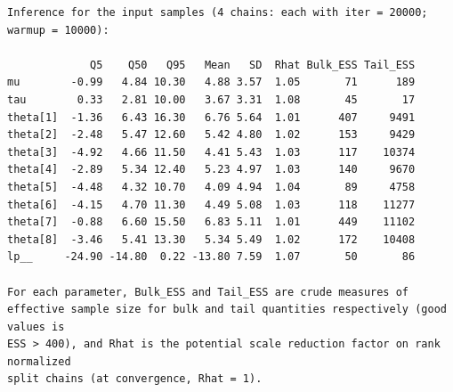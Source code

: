 \documentclass[american,]{article}
\begin{document}
\begin{verbatim}
Inference for the input samples (4 chains: each with iter = 20000; warmup = 10000):

             Q5    Q50   Q95   Mean   SD  Rhat Bulk_ESS Tail_ESS
mu        -0.99   4.84 10.30   4.88 3.57  1.05       71      189
tau        0.33   2.81 10.00   3.67 3.31  1.08       45       17
theta[1]  -1.36   6.43 16.30   6.76 5.64  1.01      407     9491
theta[2]  -2.48   5.47 12.60   5.42 4.80  1.02      153     9429
theta[3]  -4.92   4.66 11.50   4.41 5.43  1.03      117    10374
theta[4]  -2.89   5.34 12.40   5.23 4.97  1.03      140     9670
theta[5]  -4.48   4.32 10.70   4.09 4.94  1.04       89     4758
theta[6]  -4.15   4.70 11.30   4.49 5.08  1.03      118    11277
theta[7]  -0.88   6.60 15.50   6.83 5.11  1.01      449    11102
theta[8]  -3.46   5.41 13.30   5.34 5.49  1.02      172    10408
lp__     -24.90 -14.80  0.22 -13.80 7.59  1.07       50       86

For each parameter, Bulk_ESS and Tail_ESS are crude measures of 
effective sample size for bulk and tail quantities respectively (good values is 
ESS > 400), and Rhat is the potential scale reduction factor on rank normalized
split chains (at convergence, Rhat = 1).
\end{verbatim}
\end{document}
